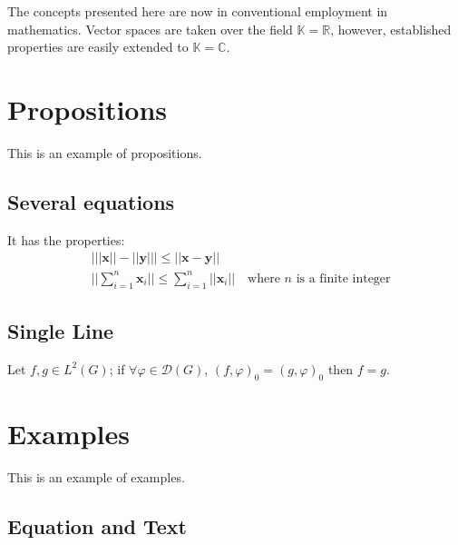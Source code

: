 \documentclass[11pt,fleqn]{book} %
\begin{document}
{\begin{corollary}
The concepts presented here are now in conventional employment in mathematics. Vector spaces are taken over the field $\mathbb{K}=\mathbb{R}$, however, established properties are easily extended to $\mathbb{K}=\mathbb{C}$.
\end{corollary}


\section{Propositions}

This is an example of propositions.

\subsection{Several equations}

\begin{proposition}
It has the properties:
\begin{align}
& \big| ||\mathbf{x}|| - ||\mathbf{y}|| \big|\leq || \mathbf{x}- \mathbf{y}||\\
&  ||\sum_{i=1}^n\mathbf{x}_i||\leq \sum_{i=1}^n||\mathbf{x}_i||\quad\text{where $n$ is a finite integer}
\end{align}
\end{proposition}

\subsection{Single Line}

\begin{proposition} 
Let $f,g\in L^2(G)$; if $\forall \varphi\in\mathcal{D}(G)$, $(f,\varphi)_0=(g,\varphi)_0$ then $f = g$. 
\end{proposition}


\section{Examples}

This is an example of examples.

\subsection{Equation and Text}

}
\end{document}
